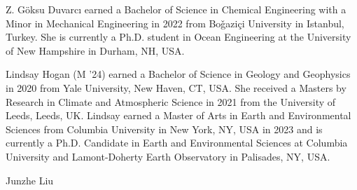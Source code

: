 \documentclass[letterpaper,journal]{IEEEtran}
\begin{document}
\begin{IEEEbiography}
{Z. G\"oksu Duvarc\i}
earned a Bachelor of Science in Chemical Engineering with a Minor in Mechanical Engineering in 2022 from Bo\v gazi\c ci University in Istanbul, Turkey. She is currently a Ph.D. student in Ocean Engineering at the University of New Hampshire in Durham, NH, USA.
\end{IEEEbiography}

\begin{IEEEbiography}{Lindsay Hogan}
(M '24) earned a Bachelor of Science in Geology and Geophysics in 2020 from Yale University, New Haven, CT, USA. She received a Masters by Research in Climate and Atmospheric Science in 2021 from the University of Leeds, Leeds, UK. Lindsay earned a Master of Arts in Earth and Environmental Sciences from Columbia University in New York, NY, USA in 2023 and is currently a Ph.D. Candidate in Earth and Environmental Sciences at Columbia University and Lamont-Doherty Earth Observatory in Palisades, NY, USA.
\end{IEEEbiography}

\begin{IEEEbiography}{Junzhe Liu}
\end{IEEEbiography}
\end{document}
